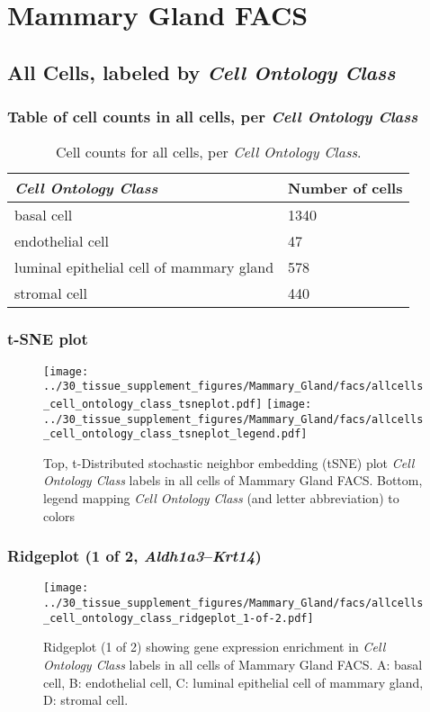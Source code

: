 \clearpage
\section{Mammary Gland FACS}

\subsection{All Cells, labeled by \emph{Cell Ontology Class}}
\subsubsection{Table of cell counts in all cells, per \emph{Cell Ontology Class}}\begin{table}[h]
\centering
\label{my-label}
\begin{tabular}{@{}ll@{}}
\toprule

\emph{Cell Ontology Class}& Number of cells \\ \midrule
basal cell & 1340 \\

endothelial cell & 47 \\

luminal epithelial cell of mammary gland & 578 \\

stromal cell & 440 \\
\bottomrule
\end{tabular}
\caption{Cell counts for all cells, per \emph{Cell Ontology Class}.}
\end{table}

\clearpage
\subsubsection{t-SNE plot}
\begin{figure}[h]
\centering
\texttt{[image: ../30\_tissue\_supplement\_figures/Mammary\_Gland/facs/allcells\_cell\_ontology\_class\_tsneplot.pdf]}
\texttt{[image: ../30\_tissue\_supplement\_figures/Mammary\_Gland/facs/allcells\_cell\_ontology\_class\_tsneplot\_legend.pdf]}
\caption{Top, t-Distributed stochastic neighbor embedding (tSNE) plot  \emph{Cell Ontology Class} labels in all cells of Mammary Gland FACS. Bottom, legend mapping \emph{Cell Ontology Class} (and letter abbreviation) to colors}
\end{figure}


\clearpage

\subsubsection{Ridgeplot (1 of 2, \emph{Aldh1a3}--\emph{Krt14})}
\begin{figure}[h]
\centering
\texttt{[image: ../30\_tissue\_supplement\_figures/Mammary\_Gland/facs/allcells\_cell\_ontology\_class\_ridgeplot\_1-of-2.pdf]}

\caption{ Ridgeplot (1 of 2)  showing gene expression enrichment in \emph{Cell Ontology Class} labels in all cells of Mammary Gland FACS. A: basal cell, B: endothelial cell, C: luminal epithelial cell of mammary gland, D: stromal cell.}
\end{figure}



